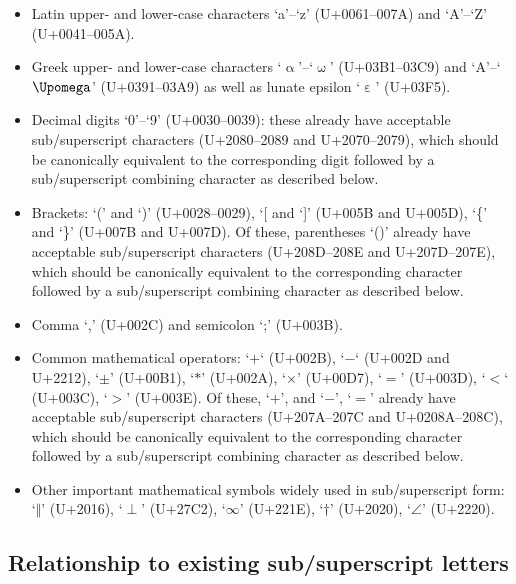 \documentclass[10pt,english]{article}
\begin{document}
\begin{itemize}

\item Latin upper- and lower-case characters `a'--`z' (U+0061--007A) and `A'--`Z' (U+0041--005A).

\item Greek upper- and lower-case characters `$\upalpha$'--`$\upomega$' (U+03B1--03C9) and `A'--`$\Upomega$' (U+0391--03A9) as well as lunate epsilon `$\upepsilon$' (U+03F5).

\item Decimal digits `0'--`9'  (U+0030--0039): these already have acceptable sub/superscript characters (U+2080--2089 and U+2070--2079), which should be canonically equivalent to the corresponding digit followed by a sub/superscript combining character as described below.

\item Brackets: `(' and `)' (U+0028--0029),  `[ and `]' (U+005B and U+005D), `\{' and `\}' (U+007B and U+007D).   Of these, parentheses `()' already have acceptable sub/superscript characters (U+208D--208E and U+207D--207E), which should be canonically equivalent to the corresponding character followed by a sub/superscript combining character as described below.

\item Comma `,' (U+002C) and semicolon `;' (U+003B).

\item Common mathematical operators: `$+$` (U+002B), `$-$` (U+002D and U+2212), `$\pm$' (U+00B1), `$*$' (U+002A), `$\times$' (U+00D7), `$=$' (U+003D), `$<$` (U+003C), `$>$' (U+003E).   Of these, `$+$', and `$-$', `$=$' already have acceptable sub/superscript characters (U+207A--207C and U+0208A--208C), which should be canonically equivalent to the corresponding character followed by a sub/superscript combining character as described below.

\item Other important mathematical symbols widely used in sub/superscript form: `$\Vert$'  (U+2016), `$\perp$' (U+27C2), `$\infty$' (U+221E), `$\dagger$' (U+2020), `$\angle$' (U+2220).

\end{itemize}

\subsection{Relationship to existing sub/superscript letters}
\end{document}
